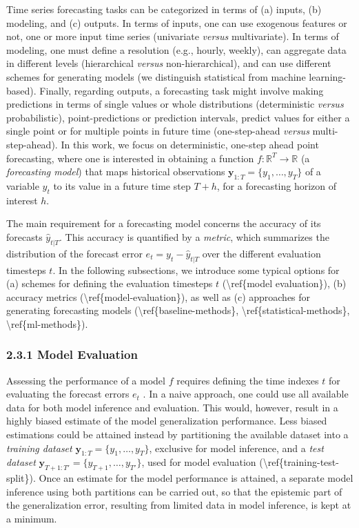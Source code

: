 \documentclass[
]{article}
\begin{document}
Time series forecasting tasks can be categorized in terms of (a) inputs,
(b) modeling, and (c) outputs. In terms of inputs, one can use exogenous
features or not, one or more input time series (univariate \emph{versus}
multivariate). In terms of modeling, one must define a resolution (e.g.,
hourly, weekly), can aggregate data in different levels (hierarchical
\emph{versus} non-hierarchical), and can use different schemes for
generating models (we distinguish statistical from machine
learning-based). Finally, regarding outputs, a forecasting task might
involve making predictions in terms of single values or whole
distributions (deterministic \emph{versus} probabilistic),
point-predictions or prediction intervals, predict values for either a
single point or for multiple points in future time (one-step-ahead
\emph{versus} multi-step-ahead). In this work, we focus on
deterministic, one-step ahead point forecasting, where one is interested
in obtaining a function \(f: \mathbb{R}^T \rightarrow \mathbb{R}\) (a
\emph{forecasting model}) that maps historical observations
\(\boldsymbol{y} _{1:T} = \{y_1,…,y_T\}\) of a variable \(y_t\) to its
value in a future time step \(T+h\), for a forecasting horizon of
interest \(h\).

The main requirement for a forecasting model concerns the accuracy of
its forecasts \(\hat{y}_{t|T}\). This accuracy is quantified by a
\emph{metric}, which summarizes the distribution of the forecast error
\(e_{t} = y_{t} - \hat{y}_{t|T}\) over the different evaluation
timesteps \(t\). In the following subsections, we introduce some typical
options for (a) schemes for defining the evaluation timesteps \(t\)
(\textbackslash ref\{model evaluation\}), (b) accuracy metrics
(\textbackslash ref\{model-evaluation\}), as well as (c) approaches for
generating forecasting models (\textbackslash ref\{baseline-methods\},
\textbackslash ref\{statistical-methods\},
\textbackslash ref\{ml-methods\}).

\hypertarget{header-n38}{%
\subsubsection{2.3.1 Model Evaluation}\label{header-n38}}

Assessing the performance of a model \(f\) requires defining the time
indexes \(t\) for evaluating the forecast errors \(e_{t}\) . In a naive
approach, one could use all available data for both model inference and
evaluation. This would, however, result in a highly biased estimate of
the model generalization performance. Less biased estimations could be
attained instead by partitioning the available dataset into a
\emph{training dataset} \(\boldsymbol{y} _{1:T} = \{y_1,…,y_T\}\),
exclusive for model inference, and a \emph{test dataset}
\(\boldsymbol{y} _{T+1:T'} = \{y_{T+1},…,y_{T'}\}\), used for model
evaluation (\textbackslash ref\{training-test-split\}). Once an estimate
for the model performance is attained, a separate model inference using
both partitions can be carried out, so that the epistemic part of the
generalization error, resulting from limited data in model inference, is
kept at a minimum.
\end{document}
